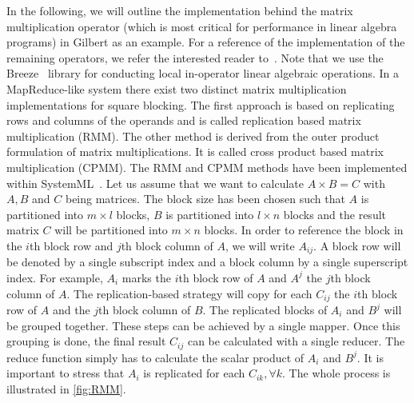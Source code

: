 In the following, we will outline the implementation behind the matrix multiplication operator (which is most critical for performance in linear algebra programs) in Gilbert as an example. For a reference of the implementation of the remaining operators, we refer the interested reader to~\cite{Rohrmann2014}. Note that we use the Breeze~\cite{breeze} library for conducting local in-operator linear algebraic operations. In a MapReduce-like system there exist two distinct matrix multiplication implementations for square blocking. The first approach is based on replicating rows and columns of the operands and is called replication based matrix multiplication (RMM). The other method is derived from the outer product formulation of matrix multiplications. It is called cross product based matrix multiplication (CPMM). The RMM and CPMM methods have been implemented within SystemML~\cite{ghoting:2011a}. Let us assume that we want to calculate $A \times B = C$ with $A,B$ and $C$ being matrices. The block size has been chosen such that $A$ is partitioned into $m\times l$ blocks, $B$ is partitioned into $l \times n$ blocks and the result matrix $C$ will be partitioned into $m\times n$ blocks. In order to reference the block in the $i$th block row and $j$th block column of $A$, we will write $A_{ij}$. A block row will be denoted by a single subscript index and a block column by a single superscript index. For example, $A_i$ marks the $i$th block row of $A$ and $A^j$ the $j$th block column of $A$. The replication-based strategy will copy for each $C_{ij}$ the $i$th block row of $A$ and the $j$th block column of $B$. The replicated blocks of $A_i$ and $B^j$ will be grouped together. These steps can be achieved by a single mapper. Once this grouping is done, the final result $C_{ij}$ can be calculated with a single reducer. The reduce function simply has to calculate the scalar product of $A_i$ and $B^j$. It is important to stress that $A_i$ is replicated for each $C_{ik},\forall k$. The whole process is illustrated in \cref{fig:RMM}.

